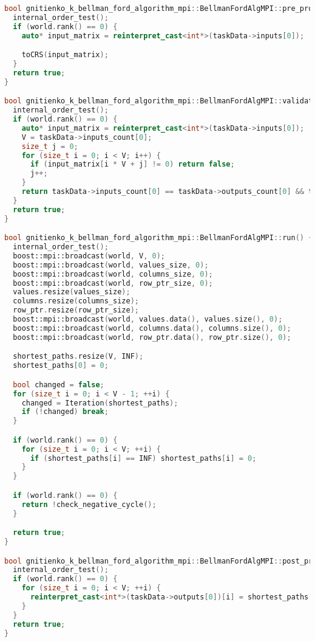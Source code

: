 \documentclass[12pt]{article}
\begin{document}
\begin{lstlisting}[language=C++, caption={Код алгоритма Беллмана-Форда}]
bool gnitienko_k_bellman_ford_algorithm_mpi::BellmanFordAlgMPI::pre_processing() {
  internal_order_test();
  if (world.rank() == 0) {
    auto* input_matrix = reinterpret_cast<int*>(taskData->inputs[0]);

    toCRS(input_matrix);
  }
  return true;
}

bool gnitienko_k_bellman_ford_algorithm_mpi::BellmanFordAlgMPI::validation() {
  internal_order_test();
  if (world.rank() == 0) {
    auto* input_matrix = reinterpret_cast<int*>(taskData->inputs[0]);
    V = taskData->inputs_count[0];
    size_t j = 0;
    for (size_t i = 0; i < V; i++) {
      if (input_matrix[i * V + j] != 0) return false;
      j++;
    }
    return taskData->inputs_count[0] == taskData->outputs_count[0] && taskData->inputs_count[0] != 0;
  }
  return true;
}

bool gnitienko_k_bellman_ford_algorithm_mpi::BellmanFordAlgMPI::run() {
  internal_order_test();
  boost::mpi::broadcast(world, V, 0);
  boost::mpi::broadcast(world, values_size, 0);
  boost::mpi::broadcast(world, columns_size, 0);
  boost::mpi::broadcast(world, row_ptr_size, 0);
  values.resize(values_size);
  columns.resize(columns_size);
  row_ptr.resize(row_ptr_size);
  boost::mpi::broadcast(world, values.data(), values.size(), 0);
  boost::mpi::broadcast(world, columns.data(), columns.size(), 0);
  boost::mpi::broadcast(world, row_ptr.data(), row_ptr.size(), 0);

  shortest_paths.resize(V, INF);
  shortest_paths[0] = 0;

  bool changed = false;
  for (size_t i = 0; i < V - 1; ++i) {
    changed = Iteration(shortest_paths);
    if (!changed) break;
  }

  if (world.rank() == 0) {
    for (size_t i = 0; i < V; ++i) {
      if (shortest_paths[i] == INF) shortest_paths[i] = 0;
    }
  }

  if (world.rank() == 0) {
    return !check_negative_cycle();
  }

  return true;
}

bool gnitienko_k_bellman_ford_algorithm_mpi::BellmanFordAlgMPI::post_processing() {
  internal_order_test();
  if (world.rank() == 0) {
    for (size_t i = 0; i < V; ++i) {
      reinterpret_cast<int*>(taskData->outputs[0])[i] = shortest_paths[i];
    }
  }
  return true;
}

\end{lstlisting}
\end{document}

